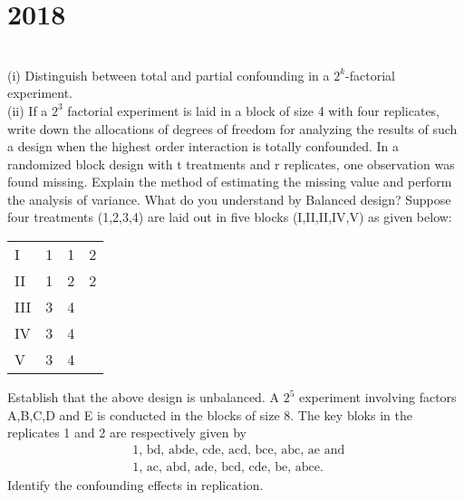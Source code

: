 \section*{2018}
\vspace{-.5cm}
\hrulefill \smallskip\\
 (i) Distinguish between total and partial confounding in a $2^k$-factorial experiment.\\
(ii) If a $2^3$ factorial experiment is laid in a block of size 4 with four replicates, write down the allocations of degrees of freedom for analyzing the results of such a design when the highest order interaction is totally confounded.
\myline
{} In a randomized block design with t treatments and r replicates, one observation was found missing. Explain the method of estimating the missing value and perform the analysis of variance.
\myline
{} What do you understand by Balanced design? Suppose four treatments (1,2,3,4) are laid out in five blocks (I,II,II,IV,V) as given below:
\begin{center}
\begin{tabular}{lccc}
     I & 1 & 1 & 2 \\
     II& 1 & 2 & 2 \\
     III & 3 & 4 & \\
     IV & 3 & 4 & \\
     V & 3 & 4 &
\end{tabular}
\end{center}
 Establish that the above design is unbalanced.
\myline
{} A $2^5$ experiment involving factors A,B,C,D and E is conducted in the blocks of size 8. The key bloks in the replicates 1 and 2 are respectively given by 
\[ \begin{aligned}
&\text{1, bd, abde, cde, acd, bce, abc, ae and }\\
& \text{1, ac, abd, ade, bcd, cde, be, abce. }    
\end{aligned}\] Identify the confounding effects in replication.
